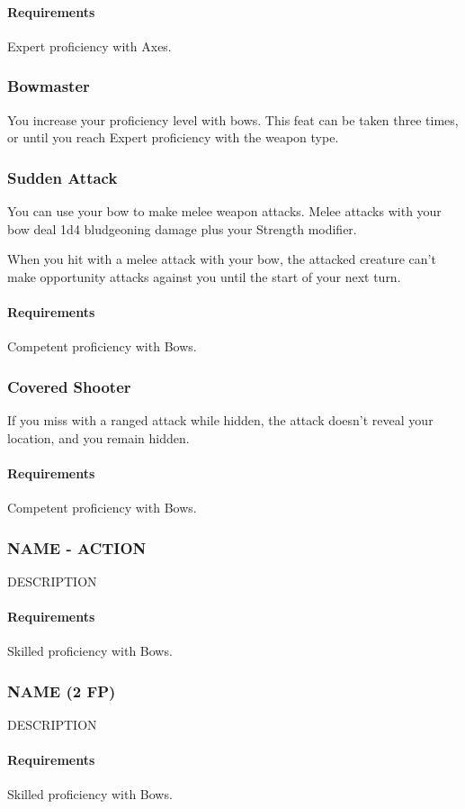     \paragraph{Requirements} Expert proficiency with Axes.
\subsubsection{Bowmaster} \label{feat::bowmaster}
    You increase your proficiency level with bows.
    This feat can be taken three times, or until you reach Expert proficiency with the weapon type.
\subsubsection{Sudden Attack} \label{feat::suddenattack}
    You can use your bow to make melee weapon attacks.
    Melee attacks with your bow deal 1d4 bludgeoning damage plus your Strength modifier.

    When you hit with a melee attack with your bow, the attacked creature can't make opportunity attacks against you until the start of your next turn.
    \paragraph{Requirements} Competent proficiency with Bows.
\subsubsection{Covered Shooter} \label{feat::coveredshooter}
    If you miss with a ranged attack while hidden, the attack doesn't reveal your location, and you remain hidden.
    \paragraph{Requirements} Competent proficiency with Bows.
\subsubsection{NAME - ACTION} \label{feat::name}
    DESCRIPTION
    \paragraph{Requirements} Skilled proficiency with Bows.
\subsubsection{NAME (2 FP)} \label{feat::name}
    DESCRIPTION
    \paragraph{Requirements} Skilled proficiency with Bows.
